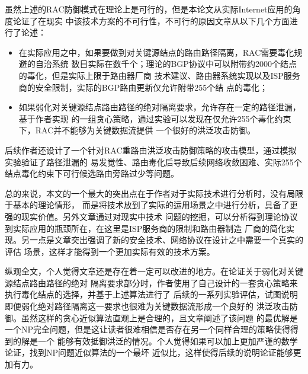 \documentclass[a4paper]{article}
\begin{document}
虽然上述的RAC防御模式在理论上是可行的，但是本论文从实际Internet应用的角度论证了在现实
中该技术方案的不可行性，不可行的原因文章从以下几个方面进行了论述：

\begin{itemize}
  \item 在实际应用之中，如果要做到对关键源结点的路由路径隔离，RAC需要毒化规避的自治系统
  数目实际在数千个；理论的BGP协议中可以附带约2000个结点的毒化，但是实际上限于路由器厂商
  技术建议、路由器系统实现以及ISP服务商的安全限制，实际的BGP路由更新仅允许附带255个结
  点的毒化；
  \item 如果弱化对关键源结点路由路径的绝对隔离要求，允许存在一定的路径泄漏，基于作者实现
  的一组贪心策略，通过实验可以发现在仅允许255个毒化约束下，RAC并不能够为关键数据流提供
  一个很好的洪泛攻击防御。
\end{itemize}

后续作者还设计了一个针对RAC重路由洪泛攻击防御策略的攻击模型，通过模拟实验验证了路径泄漏的
易发觉性、路由毒化后导致后续网络收敛困难、实际255个结点毒化约束下可行候选路由旁路过少等问题。

总的来说，本文的一个最大的突出点在于作者对于实际技术进行分析时，没有局限于基本的理论情形，
而是将技术放到了实际的运用场景之中进行分析，具备了更强的现实价值。另外文章通过对现实中技术
问题的挖掘，可以分析得到理论协议到实际应用的瓶颈所在，在这里是ISP服务商的限制和路由器制造
厂商的简化实现。另一点是文章突出强调了新的安全技术、网络协议在设计之中需要一个真实的评估
场景，这样才能得到一个更加实际有效的技术方案。

纵观全文，个人觉得文章还是存在着一定可以改进的地方。在论证关于弱化对关键源结点路由路径的绝对
隔离要求部分时，作者使用了自己设计的一套贪心策略来执行毒化结点的选择，并基于上述算法进行了
后续的一系列实验评估，试图说明即便弱化绝对路径隔离这一要求也很难为关键数据流形成一个良好的
洪泛攻击防御。虽然这样的贪心近似算法直观上是合理的，且文章阐述了该问题
的最优解是一个NP完全问题，但是这让读者很难相信是否存在另一个同样合理的策略使得得到的解是一个
能够有效抵御洪泛的情况。个人觉得如果可以加上更加严谨的数学论证，找到NP问题近似算法的一个最坏
近似比，这样使得后续的说明论证能够更加有力。

\vspace{200pt}
\end{document}
